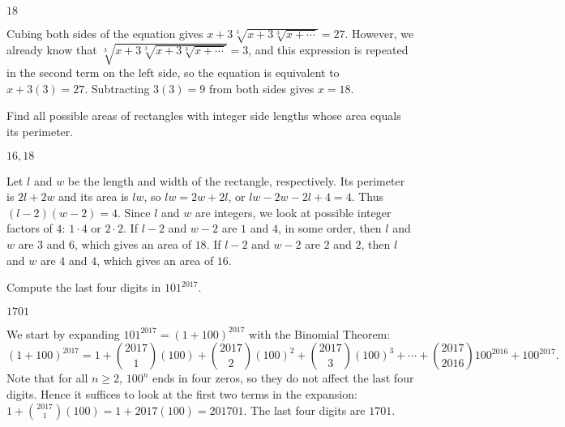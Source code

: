 \documentclass[11pt]{article}
\begin{document}
\begin{answer}
$\boxed{18}$
\end{answer}

\begin{solution}
Cubing both sides of the equation gives $x + 3\sqrt[3]{x+3\sqrt[3]{x + \cdots}} = 27$.
However, we already know that $\sqrt[3]{x + 3\sqrt[3]{x + 3\sqrt[3]{x + \cdots}}} = 3$, and this expression 
is repeated in the second term on the left side, so the equation is equivalent to $x + 3(3) = 27$.
Subtracting $3(3) = 9$ from both sides gives $x = \boxed{18}$.
\end{solution}


\begin{problem}
Find all possible areas of rectangles with integer side lengths whose area equals its perimeter.
\end{problem}

\begin{answer}
$\boxed{16, 18}$
\end{answer}

\begin{solution}
Let $l$ and $w$ be the length and width of the rectangle, respectively. Its perimeter is
$2l + 2w$ and its area is $lw$, so $lw = 2w + 2l$, or $lw - 2w - 2l + 4 = 4$. Thus
$(l-2)(w-2) = 4$. Since $l$ and $w$ are integers, we look at possible integer factors
of $4$: $1 \cdot 4$ or $2 \cdot 2$. If $l-2$ and $w-2$ are $1$ and $4$, in some order,
then $l$ and $w$ are $3$ and $6$, which gives an area of $\boxed{18}$. If $l-2$
and $w-2$ are $2$ and $2$, then $l$ and $w$ are $4$ and $4$, which gives an area of $\boxed{16}$.
\end{solution}


\begin{problem}%
Compute the last four digits in $101^{2017}$.
\end{problem}

\begin{answer}
$\boxed{1701}$
\end{answer}

\begin{solution}
We start by expanding $101^{2017} = (1 + 100)^{2017}$ with the Binomial Theorem:
\[(1 + 100)^{2017} = 1 + \binom{2017}{1}(100) + \binom{2017}{2}(100)^2 + 
\binom{2017}{3}(100)^3 + \cdots + \binom{2017}{2016}100^{2016} + 100^{2017}.\]
Note that for all $n \ge 2$, $100^n$ ends in four zeros, so they do not affect
the last four digits. Hence it suffices to look at the first two terms in the 
expansion: $1 + \binom{2017}{1}(100) = 1 + 2017(100) = 201701$. The last
four digits are $\boxed{1701}$.
\end{solution}
\end{document}
